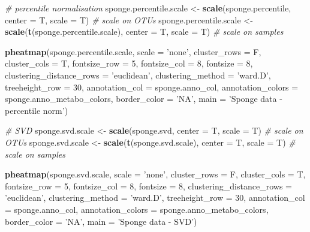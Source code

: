 \documentclass[]{book}
\newenvironment{Shaded}{\begin{snugshade}}{\end{snugshade}}
\newcommand{\KeywordTok}[1]{\textcolor[rgb]{0.13,0.29,0.53}{\textbf{#1}}}
\newcommand{\DataTypeTok}[1]{\textcolor[rgb]{0.13,0.29,0.53}{#1}}
\newcommand{\DecValTok}[1]{\textcolor[rgb]{0.00,0.00,0.81}{#1}}
\newcommand{\StringTok}[1]{\textcolor[rgb]{0.31,0.60,0.02}{#1}}
\newcommand{\CommentTok}[1]{\textcolor[rgb]{0.56,0.35,0.01}{\textit{#1}}}
\newcommand{\NormalTok}[1]{#1}
\begin{document}
\begin{Shaded}
\begin{Highlighting}[]
\CommentTok{# percentile normalisation}
\NormalTok{sponge.percentile.scale <-}\StringTok{ }\KeywordTok{scale}\NormalTok{(sponge.percentile, }\DataTypeTok{center =}\NormalTok{ T, }\DataTypeTok{scale =}\NormalTok{ T) }
\CommentTok{# scale on OTUs}
\NormalTok{sponge.percentile.scale <-}\StringTok{ }\KeywordTok{scale}\NormalTok{(}\KeywordTok{t}\NormalTok{(sponge.percentile.scale), }\DataTypeTok{center =}\NormalTok{ T, }\DataTypeTok{scale =}\NormalTok{ T) }
\CommentTok{# scale on samples}

\KeywordTok{pheatmap}\NormalTok{(sponge.percentile.scale, }
         \DataTypeTok{scale =} \StringTok{'none'}\NormalTok{, }
         \DataTypeTok{cluster_rows =}\NormalTok{ F, }
         \DataTypeTok{cluster_cols =}\NormalTok{ T, }
         \DataTypeTok{fontsize_row =} \DecValTok{5}\NormalTok{, }\DataTypeTok{fontsize_col =} \DecValTok{8}\NormalTok{,}
         \DataTypeTok{fontsize =} \DecValTok{8}\NormalTok{,}
         \DataTypeTok{clustering_distance_rows =} \StringTok{'euclidean'}\NormalTok{,}
         \DataTypeTok{clustering_method =} \StringTok{'ward.D'}\NormalTok{,}
         \DataTypeTok{treeheight_row =} \DecValTok{30}\NormalTok{,}
         \DataTypeTok{annotation_col =}\NormalTok{ sponge.anno_col,}
         \DataTypeTok{annotation_colors =}\NormalTok{ sponge.anno_metabo_colors,}
         \DataTypeTok{border_color =} \StringTok{'NA'}\NormalTok{,}
         \DataTypeTok{main =} \StringTok{'Sponge data - percentile norm'}\NormalTok{)}


\CommentTok{# SVD}
\NormalTok{sponge.svd.scale <-}\StringTok{ }\KeywordTok{scale}\NormalTok{(sponge.svd, }\DataTypeTok{center =}\NormalTok{ T, }\DataTypeTok{scale =}\NormalTok{ T) }
\CommentTok{# scale on OTUs}
\NormalTok{sponge.svd.scale <-}\StringTok{ }\KeywordTok{scale}\NormalTok{(}\KeywordTok{t}\NormalTok{(sponge.svd.scale), }\DataTypeTok{center =}\NormalTok{ T, }\DataTypeTok{scale =}\NormalTok{ T) }
\CommentTok{# scale on samples}

\KeywordTok{pheatmap}\NormalTok{(sponge.svd.scale, }
         \DataTypeTok{scale =} \StringTok{'none'}\NormalTok{, }
         \DataTypeTok{cluster_rows =}\NormalTok{ F, }
         \DataTypeTok{cluster_cols =}\NormalTok{ T, }
         \DataTypeTok{fontsize_row =} \DecValTok{5}\NormalTok{, }\DataTypeTok{fontsize_col =} \DecValTok{8}\NormalTok{,}
         \DataTypeTok{fontsize =} \DecValTok{8}\NormalTok{,}
         \DataTypeTok{clustering_distance_rows =} \StringTok{'euclidean'}\NormalTok{,}
         \DataTypeTok{clustering_method =} \StringTok{'ward.D'}\NormalTok{,}
         \DataTypeTok{treeheight_row =} \DecValTok{30}\NormalTok{,}
         \DataTypeTok{annotation_col =}\NormalTok{ sponge.anno_col,}
         \DataTypeTok{annotation_colors =}\NormalTok{ sponge.anno_metabo_colors,}
         \DataTypeTok{border_color =} \StringTok{'NA'}\NormalTok{,}
         \DataTypeTok{main =} \StringTok{'Sponge data - SVD'}\NormalTok{)}
\end{Highlighting}
\end{Shaded}
\end{document}
